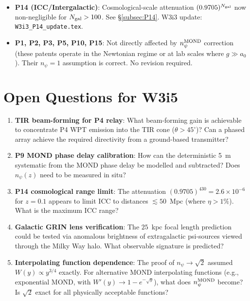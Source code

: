 \documentclass[aps,prd,twocolumn,superscriptaddress]{revtex4-2}
\newcommand{\npsi}{n_\psi}
\newcommand{\ee}[1]{\times 10^{#1}}
\begin{document}
\begin{itemize}
  \item \textbf{P14 (ICC/Intergalactic)}: Cosmological-scale attenuation
    $(0.9705)^{N_{\rm gal}}$ now non-negligible for $N_{\rm gal} > 100$.
    See \S\ref{subsec:P14}. W3i3 update: \texttt{W3i3\_P14\_update.tex}.

  \item \textbf{P1, P2, P3, P5, P10, P15}: Not directly affected by
    $\npsi^{\rm MOND}$ correction (these patents operate in the
    Newtonian regime or at lab scales where $g \gg a_0$).
    Their $\npsi = 1$ assumption is correct. No revision required.
\end{itemize}

\section{Open Questions for W3i5}
\label{sec:open}

\begin{enumerate}
  \item \textbf{TIR beam-forming for P4 relay}: What beam-forming gain is
    achievable to concentrate P4 WPT emission into the TIR cone
    ($\theta > 45^\circ$)?  Can a phased array achieve the required
    directivity from a ground-based transmitter?

  \item \textbf{P9 MOND phase delay calibration}: How can the
    deterministic 5~m systematic from the MOND phase delay be modelled
    and subtracted?  Does $\npsi(z)$ need to be measured in situ?

  \item \textbf{P14 cosmological range limit}: The attenuation
    $(0.9705)^{430} = 2.6\ee{-6}$ for $z = 0.1$ appears to limit ICC
    to distances $\lesssim 50$~Mpc (where $\eta > 1\%$).
    What is the maximum ICC range?

  \item \textbf{Galactic GRIN lens verification}: The $25$~kpc focal
    length prediction could be tested via anomalous brightness of
    extragalactic psi-sources viewed through the Milky Way halo.
    What observable signature is predicted?

  \item \textbf{Interpolating function dependence}: The proof of
    $\npsi \to \sqrt{2}$ assumed $W(y) \propto y^{3/4}$ exactly.
    For alternative MOND interpolating functions (e.g., exponential
    MOND, with $W'(y) \to 1-e^{-\sqrt{y}}$), what does $\npsi^{\rm MOND}$
    become?  Is $\sqrt{2}$ exact for all physically acceptable functions?
\end{enumerate}
\end{document}
